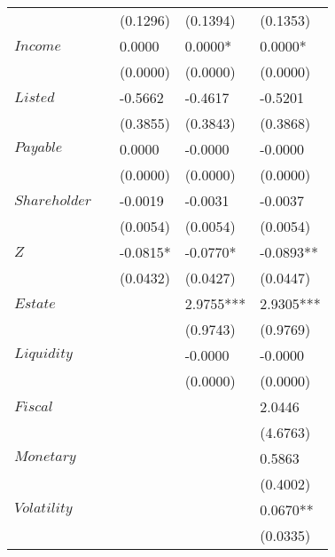 \begin{table}
\begin{center}
\begin{longtable}{lllll}
			                &            & (0.1296)   & (0.1394)    & (0.1353)     \\
			\(Income\)      &            & 0.0000     & 0.0000*     & 0.0000*      \\
			                &            & (0.0000)   & (0.0000)    & (0.0000)     \\
			\(Listed\)      &            & -0.5662    & -0.4617     & -0.5201      \\
			                &            & (0.3855)   & (0.3843)    & (0.3868)     \\
			\(Payable\)     &            & 0.0000     & -0.0000     & -0.0000      \\
			                &            & (0.0000)   & (0.0000)    & (0.0000)     \\
			\(Shareholder\) &            & -0.0019    & -0.0031     & -0.0037      \\
			                &            & (0.0054)   & (0.0054)    & (0.0054)     \\
			\(Z\)           &            & -0.0815*   & -0.0770*    & -0.0893**    \\
			                &            & (0.0432)   & (0.0427)    & (0.0447)     \\
			\(Estate\)      &            &            & 2.9755***   & 2.9305***    \\
			                &            &            & (0.9743)    & (0.9769)     \\
			\(Liquidity\)   &            &            & -0.0000     & -0.0000      \\
			                &            &            & (0.0000)    & (0.0000)     \\
			\(Fiscal\)      &            &            &             & 2.0446       \\
			                &            &            &             & (4.6763)     \\
			\(Monetary\)    &            &            &             & 0.5863       \\
			                &            &            &             & (0.4002)     \\
			\(Volatility\)  &            &            &             & 0.0670**     \\
			                &            &            &             & (0.0335)     \\
			\hline
		\end{longtable}
	\end{center}
\end{table}
